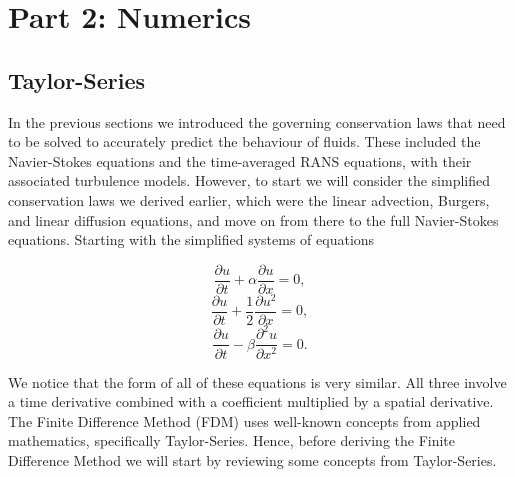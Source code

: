 \part{Part 2: Numerics}


\chapter{Taylor-Series}
In the previous sections we introduced the governing conservation laws that need to be solved to accurately predict the behaviour of fluids. These included the Navier-Stokes equations and the time-averaged RANS equations, with their associated turbulence models. However, to start we will consider the simplified conservation laws we derived earlier, which were the linear advection, Burgers, and linear diffusion equations, and move on from there to the full Navier-Stokes equations. Starting with the simplified systems of equations
\begin{eqBox}
\begin{equation}
	\frac{\partial u}{\partial t} +  \alpha \frac{\partial u}{\partial x} = 0,
\end{equation}
\begin{equation}
	\frac{\partial u}{\partial t} +  \frac{1}{2} \frac{\partial u^2}{\partial x} = 0,
\end{equation}
\begin{equation}
	\frac{\partial u}{\partial t} - \beta \frac{\partial^2 u}{\partial x^2} = 0.
\end{equation}
\end{eqBox}
We notice that the form of all of these equations is very similar. All three involve a time derivative combined with a coefficient multiplied by a spatial derivative. The Finite Difference Method (FDM) uses well-known concepts from applied mathematics, specifically Taylor-Series. Hence, before deriving the Finite Difference Method we will start by reviewing some concepts from Taylor-Series.



